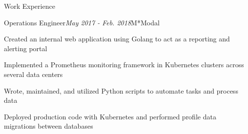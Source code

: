 \documentclass{resume} %
\begin{document}
\begin{rSection}{\vspace{-5pt}Work Experience}
\begin{rSubsection}{Operations Engineer}{\em May 2017 - Feb. 2018}{M*Modal}{}
\item {Created an internal web application using Golang to act as a reporting and alerting portal}
\item {Implemented a Prometheus monitoring framework in Kubernetes clusters across several data centers}
\item {Wrote, maintained, and utilized Python scripts to automate tasks and process data}
\item {Deployed production code with Kubernetes and performed profile data migrations between databases}
\end{rSubsection}

\end{rSection}
\end{document}
